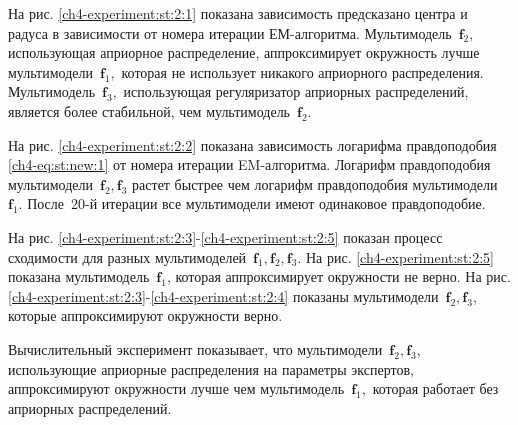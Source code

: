 На рис. \ref{ch4-experiment:st:2:1} показана зависимость предсказано центра и радуса в зависимости от номера итерации ЕМ-алгоритма.
Мультимодель~$\textbf{f}_2,$ использующая априорное распределение, аппроксимирует окружность лучше мультимодели~$\textbf{f}_1,$ которая не использует никакого априорного распределения.
Мультимодель~$\textbf{f}_3,$ использующая регуляризатор априорных распределений, является более стабильной, чем мультимодель~$\textbf{f}_2$.

На рис. \ref{ch4-experiment:st:2:2} показана зависимость логарифма правдоподобия \eqref{ch4-eq:st:new:1} от номера итерации EM-алгоритма.
Логарифм правдоподобия мультимодели~$\textbf{f}_2, \textbf{f}_3$ растет быстрее чем логарифм правдоподобия мультимодели~$\textbf{f}_1$.  После~$20$-й итерации все мультимодели имеют одинаковое правдоподобие.

На рис. \ref{ch4-experiment:st:2:3}-\ref{ch4-experiment:st:2:5} показан процесс сходимости для разных мультимоделей~$\textbf{f}_1, \textbf{f}_2, \textbf{f}_3$.
На рис. \ref{ch4-experiment:st:2:5} показана мультимодель~$\textbf{f}_1$, которая аппроксимирует окружности не верно.
На рис. \ref{ch4-experiment:st:2:3}-\ref{ch4-experiment:st:2:4} показаны мультимодели~$\textbf{f}_2, \textbf{f}_3$, которые аппроксимируют окружности верно.

Вычислительный эксперимент показывает, что мультимодели~$\textbf{f}_2, \textbf{f}_3,$ использующие априорные распределения на параметры экспертов, аппроксимируют окружности лучше чем мультимодель~$\textbf{f}_1,$ которая работает без априорных распределений.


